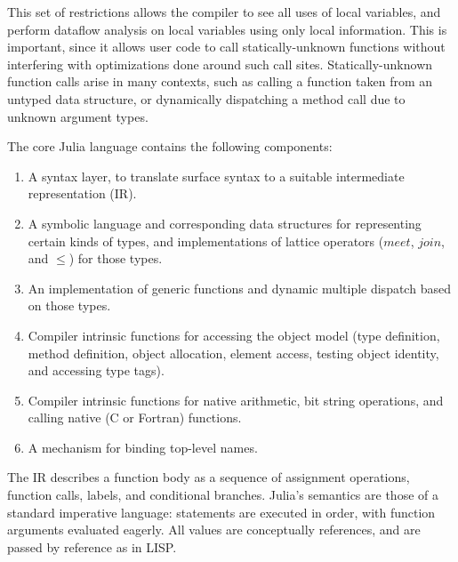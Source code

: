 \documentclass[9pt]{sigplanconf}
\begin{document}
This set of restrictions allows the compiler to see all uses of local
variables, and perform dataflow analysis on local variables using only
local information. This is important, since it allows user code to call
statically-unknown functions without interfering with optimizations done
around such call sites. Statically-unknown function calls arise in
many contexts, such as calling a function taken from an untyped data structure,
or dynamically dispatching a method call due to unknown argument types.

The core Julia language contains the following components:

\begin{enumerate}
\item A syntax layer, to translate surface syntax to a suitable
intermediate representation (IR).
\item A symbolic language and corresponding data structures for representing
certain kinds of types, and implementations of lattice operators ($meet$,
$join$, and $\leq$) for those types.
\item An implementation of generic functions and dynamic multiple dispatch
based on those types.
\item Compiler intrinsic functions for accessing the object model
(type definition, method definition, object allocation, element access,
testing object identity, and accessing type tags).
\item Compiler intrinsic functions for native arithmetic, bit string operations,
and calling native (C or Fortran) functions.
\item A mechanism for binding top-level names.
\end{enumerate}

The IR describes a function body as a sequence of assignment operations,
function calls, labels, and conditional branches. Julia's semantics
are those of a standard imperative language: statements are executed in order,
with function arguments evaluated eagerly. All values are conceptually
references, and are passed by reference as in LISP.

\end{document}

